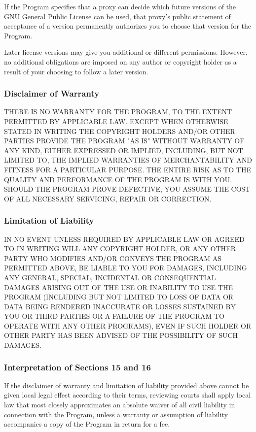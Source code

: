\documentclass{ctexart}
\begin{document}
  If the Program specifies that a proxy can decide which future
versions of the GNU General Public License can be used, that proxy's
public statement of acceptance of a version permanently authorizes you
to choose that version for the Program.

  Later license versions may give you additional or different
permissions.  However, no additional obligations are imposed on any
author or copyright holder as a result of your choosing to follow a
later version.

\subsubsection{Disclaimer of Warranty}

  THERE IS NO WARRANTY FOR THE PROGRAM, TO THE EXTENT PERMITTED BY
APPLICABLE LAW.  EXCEPT WHEN OTHERWISE STATED IN WRITING THE COPYRIGHT
HOLDERS AND/OR OTHER PARTIES PROVIDE THE PROGRAM "AS IS" WITHOUT WARRANTY
OF ANY KIND, EITHER EXPRESSED OR IMPLIED, INCLUDING, BUT NOT LIMITED TO,
THE IMPLIED WARRANTIES OF MERCHANTABILITY AND FITNESS FOR A PARTICULAR
PURPOSE.  THE ENTIRE RISK AS TO THE QUALITY AND PERFORMANCE OF THE PROGRAM
IS WITH YOU.  SHOULD THE PROGRAM PROVE DEFECTIVE, YOU ASSUME THE COST OF
ALL NECESSARY SERVICING, REPAIR OR CORRECTION.

\subsubsection{Limitation of Liability}

  IN NO EVENT UNLESS REQUIRED BY APPLICABLE LAW OR AGREED TO IN WRITING
WILL ANY COPYRIGHT HOLDER, OR ANY OTHER PARTY WHO MODIFIES AND/OR CONVEYS
THE PROGRAM AS PERMITTED ABOVE, BE LIABLE TO YOU FOR DAMAGES, INCLUDING ANY
GENERAL, SPECIAL, INCIDENTAL OR CONSEQUENTIAL DAMAGES ARISING OUT OF THE
USE OR INABILITY TO USE THE PROGRAM (INCLUDING BUT NOT LIMITED TO LOSS OF
DATA OR DATA BEING RENDERED INACCURATE OR LOSSES SUSTAINED BY YOU OR THIRD
PARTIES OR A FAILURE OF THE PROGRAM TO OPERATE WITH ANY OTHER PROGRAMS),
EVEN IF SUCH HOLDER OR OTHER PARTY HAS BEEN ADVISED OF THE POSSIBILITY OF
SUCH DAMAGES.

\subsubsection{Interpretation of Sections 15 and 16}

  If the disclaimer of warranty and limitation of liability provided
above cannot be given local legal effect according to their terms,
reviewing courts shall apply local law that most closely approximates
an absolute waiver of all civil liability in connection with the
Program, unless a warranty or assumption of liability accompanies a
copy of the Program in return for a fee.
\end{document}
